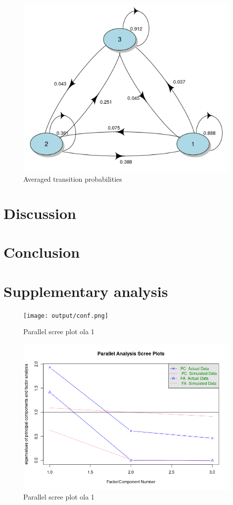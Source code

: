 \begin{figure}[htp]
    \centering
    \includegraphics[width=11cm]{output/plot_transition.png}
    \caption{Averaged transition probabilities}
        \label{fig:trans}
\end{figure}


\section{Discussion}

\section{Conclusion}


\newpage

\printbibliography

\newpage

\section{Supplementary analysis}


\begin{figure}[htp]
    \centering
    \texttt{[image: output/conf.png]}
    \caption{Parallel scree plot ola 1}
    \label{fig:scree1}
\end{figure}


\begin{figure}[htp]
    \centering
    \includegraphics[width=11cm]{output/scree_plots1.png}
    \caption{Parallel scree plot ola 1}
    \label{fig:scree1}
\end{figure}


